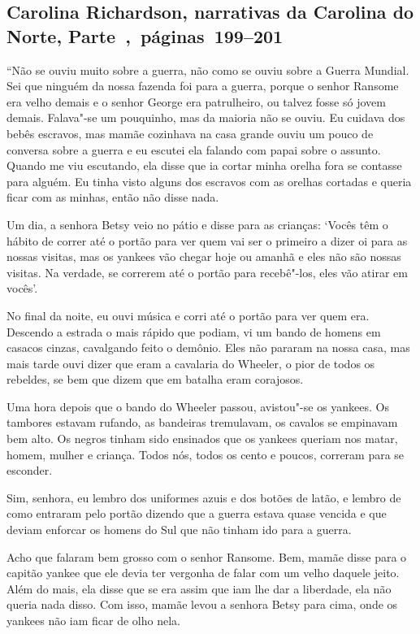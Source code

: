 \subsection{Carolina Richardson, narrativas da Carolina do Norte, Parte~,~páginas~199--201} \label{ref225}

``Não se ouviu muito sobre a guerra, não como se ouviu sobre a Guerra
Mundial. Sei que ninguém da nossa fazenda foi para a guerra, porque o
senhor Ransome era velho demais e o senhor George era patrulheiro, ou
talvez fosse só jovem demais. Falava"-se um pouquinho, mas da maioria não
se ouviu. Eu cuidava dos bebês escravos, mas mamãe cozinhava na casa
grande ouviu um pouco de conversa sobre a guerra e eu escutei ela
falando com papai sobre o assunto. Quando me viu escutando, ela disse
que ia cortar minha orelha fora se contasse para alguém. Eu tinha visto
alguns dos escravos com as orelhas cortadas e queria ficar com as
minhas, então não disse nada.

Um dia, a senhora Betsy veio no pátio e disse para as crianças: `Vocês
têm o hábito de correr até o portão para ver quem vai ser o primeiro a
dizer oi para as nossas visitas, mas os yankees vão chegar hoje ou
amanhã e eles não são nossas visitas. Na verdade, se correrem até o
portão para recebê"-los, eles vão atirar em vocês'.

No final da noite, eu ouvi música e corri até o portão para ver quem
era. Descendo a estrada o mais rápido que podiam, vi um bando de homens
em casacos cinzas, cavalgando feito o demônio. Eles não pararam na nossa
casa, mas mais tarde ouvi dizer que eram a cavalaria do Wheeler, o pior
de todos os rebeldes, se bem que dizem que em batalha eram corajosos.

Uma hora depois que o bando do Wheeler passou, avistou"-se os yankees. Os
tambores estavam rufando, as bandeiras tremulavam, os cavalos se
empinavam bem alto. Os negros tinham sido ensinados que os yankees
queriam nos matar, homem, mulher e criança. Todos nós, todos os cento e
poucos, correram para se esconder.

Sim, senhora, eu lembro dos uniformes azuis e dos botões de latão, e
lembro de como entraram pelo portão dizendo que a guerra estava quase
vencida e que deviam enforcar os homens do Sul que não tinham ido para a
guerra.

Acho que falaram bem grosso com o senhor Ransome. Bem, mamãe disse para
o capitão yankee que ele devia ter vergonha de falar com um velho
daquele jeito. Além do mais, ela disse que se era assim que iam lhe dar
a liberdade, ela não queria nada disso. Com isso, mamãe levou a senhora
Betsy para cima, onde os yankees não iam ficar de olho nela.

